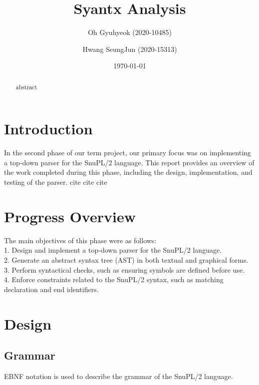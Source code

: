 \documentclass[12pt]{article}
\title{Syantx Analysis}
\author{Oh Gyuhyeok (2020-10485)}
\author{Hwang SeungJun (2020-15313)}
\affil{SNUCSE}
\date{\today}
\begin{document}
\maketitle

\begin{abstract}
    abstract
\end{abstract}

\section{Introduction}

In the second phase of our term project, our primary focus was on implementing a top-down parser for the SnuPL/2 language. 
This report provides an overview of the work completed during this phase, including the design, implementation, and testing of the parser.
cite \cite[cite1]{Textbook_Compiler}
cite \cite[cite2]{Egger_Lecture_Note}
cite \cite[cite3]{Egger_git}


\section{Progress Overview}
The main objectives of this phase were as follows:\\
1. Design and implement a top-down parser for the SnuPL/2 language. \\
2. Generate an abstract syntax tree (AST) in both textual and graphical forms. \\
3. Perform syntactical checks, such as ensuring symbols are defined before use. \\
4. Enforce constraints related to the SnuPL/2 syntax, such as matching declaration and end identifiers. \\

\section{Design}
\subsection{Grammar}
EBNF notation is used to describe the grammar of the SnuPL/2 language.

\end{document}
